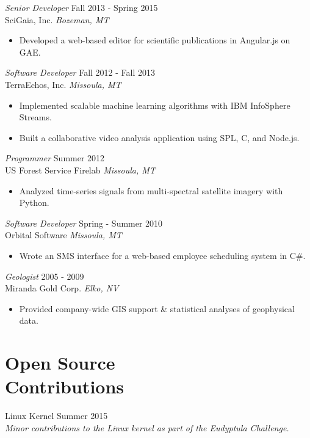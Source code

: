 \documentclass[line,margin]{res}
\begin{document}
\begin{resume}
        {\sl Senior Developer} \hfill  Fall 2013 - Spring 2015\\
        SciGaia, Inc. \hfill {\sl Bozeman, MT}
        \begin{itemize} \itemsep -2pt
            \item Developed a web-based editor for scientific publications in Angular.js on GAE.
        \end{itemize}

        {\sl Software Developer} \hfill  Fall 2012 - Fall 2013\\
        TerraEchos, Inc. \hfill {\sl Missoula, MT}
        \begin{itemize} \itemsep -2pt
            \item Implemented scalable machine learning algorithms with IBM InfoSphere\textsuperscript{\textregistered} Streams.
            \item Built a collaborative video analysis application using SPL, C, and Node.js.
        \end{itemize}

        {\sl Programmer} \hfill  Summer 2012\\
        US Forest Service Firelab \hfill {\sl Missoula, MT}
        \begin{itemize} \itemsep -2pt
            \item Analyzed time-series signals from multi-spectral satellite imagery with Python.
        \end{itemize}

        {\sl Software Developer} \hfill Spring - Summer 2010\\
        Orbital Software \hfill {\sl Missoula, MT}
        \begin{itemize} \itemsep -2pt
            \item Wrote an SMS interface for a web-based employee scheduling system in C\#.
        \end{itemize}

        {\sl Geologist} \hfill 2005 - 2009 \\
        Miranda Gold Corp. \hfill {\sl Elko, NV}
        \begin{itemize}  \itemsep -2pt
            \item Provided company-wide GIS support \& statistical analyses of geophysical data.
        \end{itemize}
\section{\sc Open Source\\ Contributions}
        Linux Kernel \hfill Summer 2015\\
            \emph{Minor contributions to the Linux kernel as part of the Eudyptula Challenge.}


\end{resume}
\end{document}
